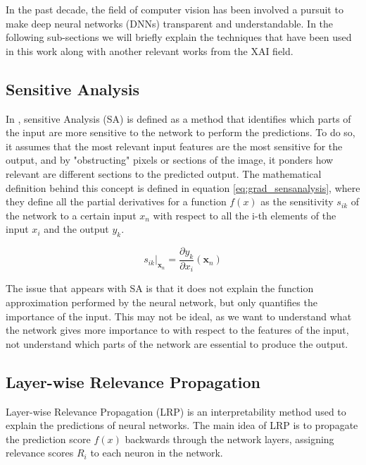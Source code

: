 In the past decade, the field of computer vision has been involved a pursuit to make deep neural networks (DNNs) transparent and understandable. In the following sub-sections we will briefly explain the techniques that have been used in this work along with another relevant works from the XAI field.

\subsection{Sensitive Analysis}

In \cite{xai_survey2019, sensitivity_analysis}, sensitive Analysis (SA) is defined as a method that identifies which parts of the input are more sensitive to the network to perform the predictions. To do so, it assumes that the most relevant input features are the most sensitive for the output, and by "obstructing" pixels or sections of the image, it ponders how relevant are different sections to the predicted output. The mathematical definition behind this concept is defined in equation \ref{eq:grad_sensanalysis}, where they define all the partial derivatives for a function $f(x)$ as the sensitivity $s_{ik}$ of the network to a certain input $x_n$ with respect to all the i-th elements of the input $x_i$ and the output $y_k$.

\begin{equation}
	\label{eq:grad_sensanalysis}
	s_{ik} \bigg|_{\mathbf{x}_n} = \frac{\partial y_k}{\partial x_i} (\mathbf{x}_n)
\end{equation}

The issue that appears with SA is that it does not explain the function approximation performed by the neural network, but only quantifies the importance of the input. This may not be ideal, as we want to understand what the network gives more importance to with respect to the features of the input, not understand which parts of the network are essential to produce the output.

\subsection{Layer-wise Relevance Propagation}
Layer-wise Relevance Propagation (LRP) \cite{bach2015pixel} is an interpretability method used to explain the predictions of neural networks. The main idea of LRP is to propagate the prediction score $f(x)$ backwards through the network layers, assigning relevance scores $R_i$ to each neuron in the network.

